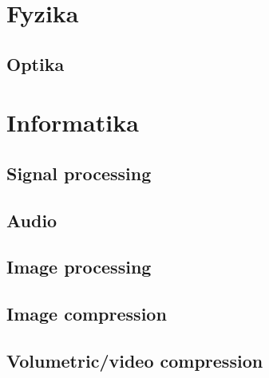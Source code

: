 \section{Fyzika}
    \subsection{Optika}
    
    
\section{Informatika}
    \subsection{Signal processing}
    \subsection{Audio}
    \subsection{Image processing}
    \subsection{Image compression}
    \subsection{Volumetric/video compression}
     
